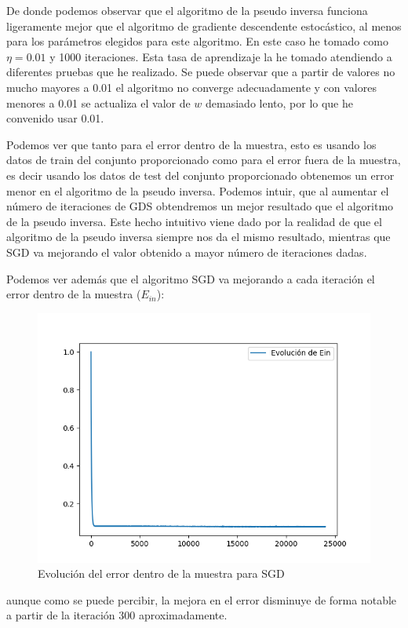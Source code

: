 \documentclass[12pt,a4paper]{article}
\begin{document}
De donde podemos observar que el algoritmo de la pseudo inversa funciona ligeramente mejor que el algoritmo de gradiente descendente estocástico, al menos para los parámetros elegidos para este algoritmo. En este caso he tomado como $\eta = 0.01$ y 1000 iteraciones. Esta tasa de aprendizaje la he tomado atendiendo a diferentes pruebas que he realizado. Se puede observar que a partir de valores no mucho mayores a 0.01 el algoritmo no converge adecuadamente y con valores menores a 0.01 se actualiza el valor de $w$ demasiado lento, por lo que he convenido usar 0.01.

Podemos ver que tanto para el error dentro de la muestra, esto es usando los datos de train del conjunto proporcionado como para el error fuera de la muestra, es decir usando los datos de test del conjunto proporcionado obtenemos un error menor en el algoritmo de la pseudo inversa. Podemos intuir, que al aumentar el número de iteraciones de GDS obtendremos un mejor resultado que el algoritmo de la pseudo inversa. Este hecho intuitivo viene dado por la realidad de que el algoritmo de la pseudo inversa siempre nos da el mismo resultado, mientras que SGD va mejorando el valor obtenido a mayor número de iteraciones dadas.

Podemos ver además que el algoritmo SGD va mejorando a cada iteración el error dentro de la muestra ($E_{in}$):
\begin{figure}[H]
	\centering
	\includegraphics[scale=0.8]{./Imagenes/ej2-1_evol_ein.png}
	\caption{Evolución del error dentro de la muestra para SGD}
	\label{ej2-1_evol_ein}
\end{figure}
aunque como se puede percibir, la mejora en el error disminuye de forma notable a partir de la iteración 300 aproximadamente.
\end{document}
